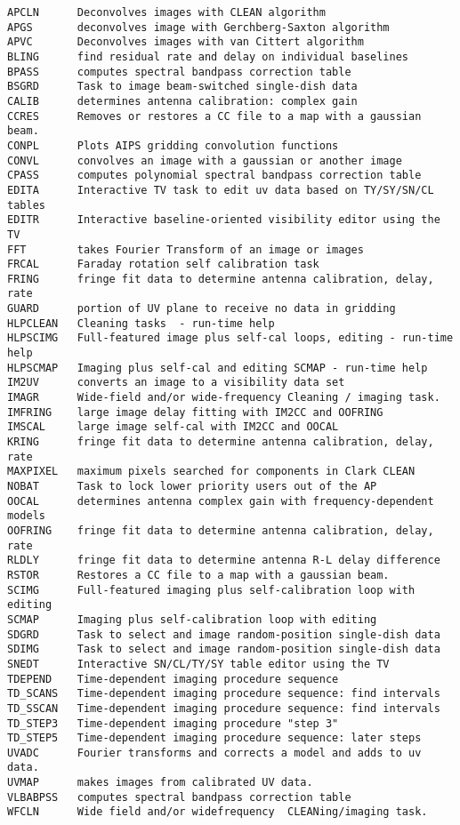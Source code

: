 \vskip 0.5pt
\bbve\begin{verbatim}
APCLN      Deconvolves images with CLEAN algorithm
APGS       deconvolves image with Gerchberg-Saxton algorithm
APVC       Deconvolves images with van Cittert algorithm
BLING      find residual rate and delay on individual baselines
BPASS      computes spectral bandpass correction table
BSGRD      Task to image beam-switched single-dish data
CALIB      determines antenna calibration: complex gain
CCRES      Removes or restores a CC file to a map with a gaussian beam.
CONPL      Plots AIPS gridding convolution functions
CONVL      convolves an image with a gaussian or another image
CPASS      computes polynomial spectral bandpass correction table
EDITA      Interactive TV task to edit uv data based on TY/SY/SN/CL tables
EDITR      Interactive baseline-oriented visibility editor using the TV
FFT        takes Fourier Transform of an image or images
FRCAL      Faraday rotation self calibration task
FRING      fringe fit data to determine antenna calibration, delay, rate
GUARD      portion of UV plane to receive no data in gridding
HLPCLEAN   Cleaning tasks  - run-time help
HLPSCIMG   Full-featured image plus self-cal loops, editing - run-time help
HLPSCMAP   Imaging plus self-cal and editing SCMAP - run-time help
IM2UV      converts an image to a visibility data set
IMAGR      Wide-field and/or wide-frequency Cleaning / imaging task.
IMFRING    large image delay fitting with IM2CC and OOFRING
IMSCAL     large image self-cal with IM2CC and OOCAL
KRING      fringe fit data to determine antenna calibration, delay, rate
MAXPIXEL   maximum pixels searched for components in Clark CLEAN
NOBAT      Task to lock lower priority users out of the AP
OOCAL      determines antenna complex gain with frequency-dependent models
OOFRING    fringe fit data to determine antenna calibration, delay, rate
RLDLY      fringe fit data to determine antenna R-L delay difference
RSTOR      Restores a CC file to a map with a gaussian beam.
SCIMG      Full-featured imaging plus self-calibration loop with editing
SCMAP      Imaging plus self-calibration loop with editing
SDGRD      Task to select and image random-position single-dish data
SDIMG      Task to select and image random-position single-dish data
SNEDT      Interactive SN/CL/TY/SY table editor using the TV
TDEPEND    Time-dependent imaging procedure sequence
TD_SCANS   Time-dependent imaging procedure sequence: find intervals
TD_SSCAN   Time-dependent imaging procedure sequence: find intervals
TD_STEP3   Time-dependent imaging procedure "step 3"
TD_STEP5   Time-dependent imaging procedure sequence: later steps
UVADC      Fourier transforms and corrects a model and adds to uv data.
UVMAP      makes images from calibrated UV data.
VLBABPSS   computes spectral bandpass correction table
WFCLN      Wide field and/or widefrequency  CLEANing/imaging task.
\end{verbatim}\eve

